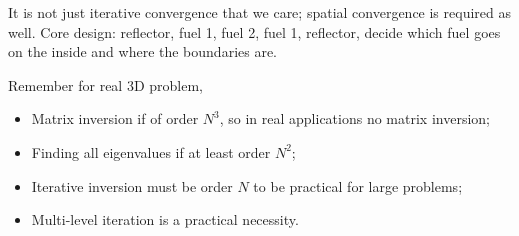 \documentclass{school-22.211-notes}
\begin{document}
\clearpage
{}
It is not just iterative convergence that we care; spatial convergence is required as well. Core design: reflector, fuel 1, fuel 2, fuel 1, reflector, decide which fuel goes on the inside and where the boundaries are. 


\clearpage
{}
Remember for real 3D problem,
\begin{itemize}
\item Matrix inversion if of order $N^3$, so in real applications no matrix inversion;
\item Finding all eigenvalues if at least order $N^2$;
\item Iterative inversion must be order $N$ to be practical for large problems;
\item Multi-level iteration is a practical necessity. 
\end{itemize}
\end{document}
